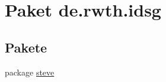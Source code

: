 \hypertarget{namespacede_1_1rwth_1_1idsg}{\section{Paket de.\-rwth.\-idsg}
\label{namespacede_1_1rwth_1_1idsg}
}
\subsection*{Pakete}
\begin{DoxyCompactItemize}
\item 
package \hyperlink{namespacede_1_1rwth_1_1idsg_1_1steve}{steve}
\end{DoxyCompactItemize}
